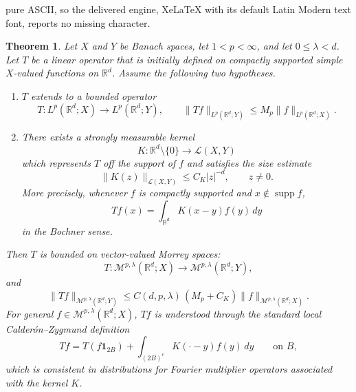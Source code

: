 \documentclass[10pt,a4paper]{amsart}
\newtheorem{theorem}{Theorem}
\newcommand{\R}{\mathbb R}
\begin{document}
pure ASCII, so the delivered engine, XeLaTeX with its default Latin Modern text font, reports no missing character.
\begin{theorem}\label{thm:morrey-lifting}
		Let $X$ and $Y$ be Banach spaces, let $1<p<\infty$, and let $0\le\lambda<d$.  Let $T$ be a linear operator that is initially defined on compactly supported simple $X$-valued functions on $\R^d$.  Assume the following two hypotheses.
		\begin{enumerate}[label=\textup{(\roman*)}]
			\item $T$ extends to a bounded operator
			\[
			T:L^p(\R^d;X)\longrightarrow L^p(\R^d;Y),
			\qquad
			\|Tf\|_{L^p(\R^d;Y)}\le M_p\|f\|_{L^p(\R^d;X)}.
			\]
			\item There exists a strongly measurable kernel
			\[
			K:\R^d\setminus\{0\}\longrightarrow\mathcal L(X,Y)
			\]
			which represents $T$ off the support of $f$ and satisfies the size estimate
			\[
			\|K(z)\|_{\mathcal L(X,Y)}\le C_K |z|^{-d},
			\qquad z\ne0.
			\]
			More precisely, whenever $f$ is compactly supported and $x\notin\operatorname{supp}f$,
			\[
			Tf(x)=\int_{\R^d}K(x-y)f(y)\,dy
			\]
			in the Bochner sense.
		\end{enumerate}
		Then $T$ is bounded on vector-valued Morrey spaces:
		\[
		T:\mathcal M^{p,\lambda}(\R^d;X)
		\longrightarrow
		\mathcal M^{p,\lambda}(\R^d;Y),
		\]
		and
		\[
		\|Tf\|_{\mathcal M^{p,\lambda}(\R^d;Y)}
		\le
		C(d,p,\lambda)\,(M_p+C_K)
		\|f\|_{\mathcal M^{p,\lambda}(\R^d;X)}.
		\]
		For general $f\in\mathcal M^{p,\lambda}(\R^d;X)$, $Tf$ is understood through the standard local Calder\'on--Zygmund definition
		\[
		Tf=T(f\mathbf 1_{2B})+
		\int_{(2B)^c}K(\cdot-y)f(y)\,dy
		\qquad\text{on }B,
		\]
		which is consistent in distributions for Fourier multiplier operators associated with the kernel $K$.
	\end{theorem}
\end{document}
